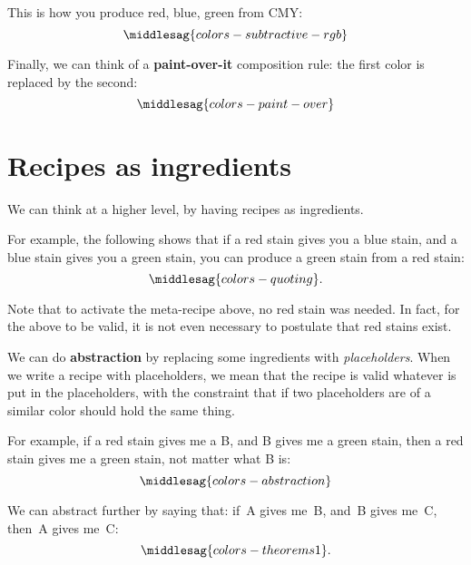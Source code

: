 This is how you produce red, blue, green from CMY:
%
\begin{equation}
	\label{eq:colors-subtractive-rgb}
	\middlesag{colors-subtractive-rgb}
\end{equation}

Finally, we can think of a \textbf{paint-over-it} composition rule: the first color is replaced by the second:
%
\begin{equation}
	\label{eq:colors-paint-over}
	\middlesag{colors-paint-over}
\end{equation}

\section{Recipes as ingredients}


We can think at a higher level, by having recipes as ingredients.

For example, the following shows that if a red stain gives you a blue stain, and a blue stain gives you a green stain, you can produce a green stain from a red stain:
%
\begin{equation}
	\label{eq:colors-quoting}
	\middlesag{colors-quoting}.
\end{equation}

Note that to activate the meta-recipe above, no red stain was needed.
In fact, for the above to be valid, it is not even necessary to postulate that red stains exist.

We can do \textbf{abstraction} by replacing some ingredients with \emph{placeholders}.
When we write a recipe with placeholders, we mean that the recipe is valid whatever is put in the placeholders, with the constraint that if two placeholders are of a similar color should hold the same thing.

For example, if a red stain gives me a B, and B gives me a green stain, then a red stain gives me a green stain, not matter what B is:
\begin{equation}
	\label{eq:colors-abstraction}
	\middlesag{colors-abstraction}
\end{equation}

We can abstract further by saying that: if~A gives me~B, and~B gives me~C, then~A gives me~C:
%
\begin{equation}
	\label{eq:colors-theorems}
	\middlesag{colors-theorems1}.
\end{equation}

